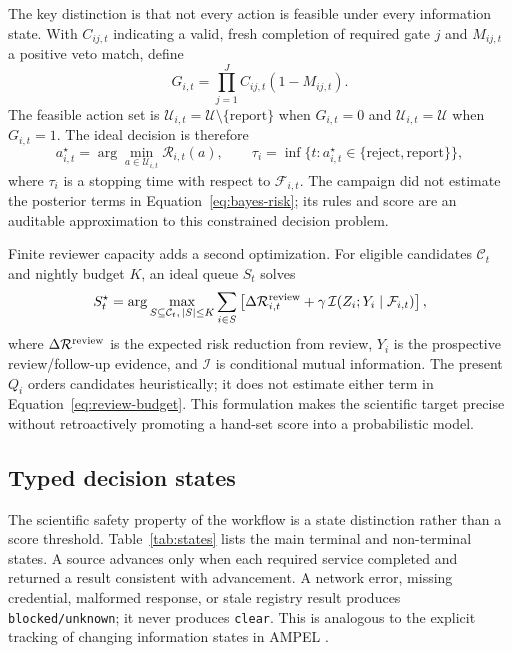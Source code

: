 \documentclass[11pt]{article}
\begin{document}
The key distinction is that not every action is feasible under every information state. With $C_{ij,t}$ indicating a valid, fresh completion of required gate $j$ and $M_{ij,t}$ a positive veto match, define
\begin{equation}
  G_{i,t}=\prod_{j=1}^{J} C_{ij,t}(1-M_{ij,t}).
\label{eq:gate-product}
\end{equation}
The feasible action set is $\mathcal{U}_{i,t}=\mathcal{U}\setminus\{\text{report}\}$ when $G_{i,t}=0$ and $\mathcal{U}_{i,t}=\mathcal{U}$ when $G_{i,t}=1$. The ideal decision is therefore
\begin{equation}
  a^{\star}_{i,t}=\arg\min_{a\in\mathcal{U}_{i,t}}\mathcal{R}_{i,t}(a),
  \qquad
  \tau_i=\inf\{t:a^{\star}_{i,t}\in\{\text{reject},\text{report}\}\},
\label{eq:optimal-decision}
\end{equation}
where $\tau_i$ is a stopping time with respect to $\mathcal{F}_{i,t}$. The campaign did not estimate the posterior terms in Equation~\ref{eq:bayes-risk}; its rules and score are an auditable approximation to this constrained decision problem.

Finite reviewer capacity adds a second optimization. For eligible candidates $\mathcal{C}_t$ and nightly budget $K$, an ideal queue $S_t$ solves
\begin{equation}
  S_t^{\star}=\arg\max_{S\subseteq\mathcal{C}_t,\,|S|\leq K}
  \sum_{i\in S}\left[\Delta\mathcal{R}_{i,t}^{\rm review}
  +\gamma\,\mathcal{I}(Z_i;Y_i\mid\mathcal{F}_{i,t})\right],
\label{eq:review-budget}
\end{equation}
where $\Delta\mathcal{R}^{\rm review}$ is the expected risk reduction from review, $Y_i$ is the prospective review/follow-up evidence, and $\mathcal{I}$ is conditional mutual information. The present $Q_i$ orders candidates heuristically; it does not estimate either term in Equation~\ref{eq:review-budget}. This formulation makes the scientific target precise without retroactively promoting a hand-set score into a probabilistic model.

\subsection{Typed decision states}

The scientific safety property of the workflow is a state distinction rather than a score threshold. Table~\ref{tab:states} lists the main terminal and non-terminal states. A source advances only when each required service completed and returned a result consistent with advancement. A network error, missing credential, malformed response, or stale registry result produces \texttt{blocked/unknown}; it never produces \texttt{clear}. This is analogous to the explicit tracking of changing information states in AMPEL \citep{nordin2019}.
\end{document}
